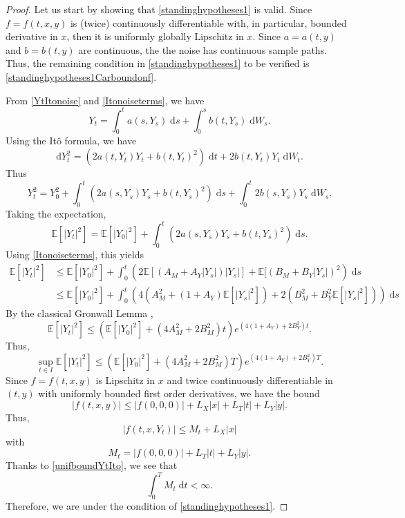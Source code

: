 \documentclass[reqno,12pt]{amsart}
\theoremstyle{plain}%
\theoremstyle{definition}
\begin{document}
\begin{proof}
    Let us start by showing that \cref{standinghypotheses1} is valid. Since $f=f(t, x, y)$ is (twice) continuously differentiable with, in particular, bounded derivative in $x$, then it is uniformly globally Lipschitz in $x$. Since $a=a(t, y)$ and $b=b(t, y)$ are continuous, the the noise has continuous sample paths. Thus, the remaining condition in \cref{standinghypotheses1} to be verified is \eqref{standinghypotheses1Carboundonf}.

    From \eqref{YtItonoise} and \eqref{Itonoiseterms}, we have
    \[
        Y_t = \int_0^t a(s, Y_s)\;\mathrm{d}s + \int_0^s b(t, Y_s)\;\mathrm{d}W_s.
    \]
    Using the It\^o formula, we have
    \[
        \mathrm{d}Y_t^2 = \left(2a(t, Y_t) Y_t  + b(t, Y_t)^2 \right) \;\mathrm{d}t + 2b(t, Y_t) Y_t\;\mathrm{d}W_t.
    \]
    Thus
    \[
        Y_t^2 = Y_0^2 + \int_0^t \left(2a(s, Y_s) Y_s  + b(t, Y_s)^2 \right) \;\mathrm{d}s + \int_0^t 2b(s, Y_s) Y_s\;\mathrm{d}W_s.
    \]
    Taking the expectation,
    \[
        \mathbb{E}[|Y_t|^2] = \mathbb{E}[|Y_0|^2] + \int_0^t \left(2a(s, Y_s) Y_s  + b(t, Y_s)^2 \right) \;\mathrm{d}s.
    \]
    Using \eqref{Itonoiseterms}, this yields
    \begin{align*}
        \mathbb{E}[|Y_t|^2] & \leq \mathbb{E}[|Y_0|^2] + \int_0^t \left(2\mathbb{E}[(A_M + A_Y |Y_s|) |Y_s|]  + \mathbb{E}[(B_M + B_Y|Y_s|)^2 \right) \;\mathrm{d}s \\
        & \leq \mathbb{E}[|Y_0|^2] + \int_0^t \left(4(A_M^2 + (1 + A_Y) \mathbb{E}[|Y_s|^2])  + 2(B_M^2 + B_Y^2\mathbb{E}[|Y_s|^2]) \right) \;\mathrm{d}s
    \end{align*}
    By the classical Gronwall Lemma \cite{Gronwall1919},
    \[
        \mathbb{E}[|Y_t|^2] \leq \left( \mathbb{E}[|Y_0|^2] + (4A_M^2 + 2B_M^2)t\right)e^{(4(1 + A_Y) + 2B_Y^2)t}.
    \]
    Thus,
    \begin{equation}
        \label{unifboundYtIto}
        \sup_{t\in I}\mathbb{E}[|Y_t|^2] \leq \left( \mathbb{E}[|Y_0|^2] + (4A_M^2 + 2B_M^2)T\right)e^{(4(1 + A_Y) + 2B_Y^2)T}.
    \end{equation}
    Since $f=f(t, x, y)$ is Lipschitz in $x$ and twice continuously differentiable in $(t, y)$ with uniformly bounded first order derivatives, we have the bound
    \[
        |f(t, x, y)| \leq |f(0, 0, 0)| + L_X|x| + L_T|t| + L_Y|y|.
    \]
    Thus,
    \[
        |f(t, x, Y_t)| \leq M_t + L_X|x|
    \]
    with
    \[
        M_t = |f(0, 0, 0)| + L_T|t| + L_Y|y|.
    \]
    Thanks to \eqref{unifboundYtIto}, we see that
    \[
        \int_0^T M_t\;\mathrm{d}t < \infty.
    \]
    Therefore, we are under the condition of \eqref{standinghypotheses1}.


\end{proof}
\end{document}
